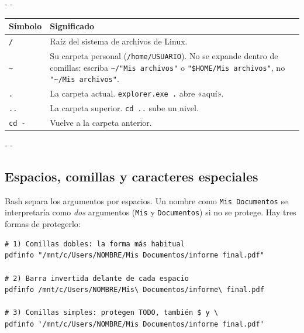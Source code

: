\documentclass[11pt,a4paper]{article}
\makeatletter
\newcommand{\necesitaespacio}[1]{\par\penalty-100\begingroup
	\setlength{\dimen@}{#1}\dimen@ii\pagegoal\advance\dimen@ii-\pagetotal
	\ifdim\dimen@>\dimen@ii\ifdim\dimen@ii>\z@\vfil\fi\penalty-\@M\fi\endgroup}
\newcommand{\cmd}[1]{\texttt{\textcolor{colcmd}{#1}}}      %
\newcommand{\arch}[1]{\texttt{\textcolor{colarch}{#1}}}    %
\newcommand{\cab}[1]{\textbf{#1}}
\newcommand{\tl}{\textasciitilde{}}  %
\makeatother
\begin{document}
	\begingroup\small
	\necesitaespacio{13\baselineskip}
	\begin{longtable}{L{2.4cm}L{12.66cm}}
		\toprule{}\cab{Símbolo} & \cab{Significado}\\\midrule
		\endfirsthead
		\bottomrule
		\endfoot
		\arch{/} & Raíz del sistema de archivos de Linux.\\*
		\arch{\tl} & Su carpeta personal (\arch{/home/USUARIO}). No se expande dentro de comillas: escriba \arch{\tl/\allowbreak{}"Mis archivos"} o \arch{"\$HOME/\allowbreak{}Mis archivos"}, no \arch{"\tl/\allowbreak{}Mis archivos"}.\\
		\arch{.} & La carpeta actual. \cmd{explorer.exe .} abre «aquí».\\
		\arch{..} & La carpeta superior. \cmd{cd ..} sube un nivel.\\*
		\cmd{cd -} & Vuelve a la carpeta anterior.\\
	\end{longtable}
	\endgroup
	
	\necesitaespacio{8\baselineskip}
	\subsection{Espacios, comillas y caracteres especiales}\label{sec:comillas}
	
	Bash separa los argumentos por espacios. Un nombre como \arch{Mis Documentos} se interpretaría como \emph{dos} argumentos (\arch{Mis} y \arch{Documentos}) si no se protege. Hay tres formas de protegerlo:
	
	\begin{lstlisting}
# 1) Comillas dobles: la forma más habitual
pdfinfo "/mnt/c/Users/NOMBRE/Mis Documentos/informe final.pdf"

# 2) Barra invertida delante de cada espacio
pdfinfo /mnt/c/Users/NOMBRE/Mis\ Documentos/informe\ final.pdf

# 3) Comillas simples: protegen TODO, también $ y \
pdfinfo '/mnt/c/Users/NOMBRE/Mis Documentos/informe final.pdf'
\end{lstlisting}
	
\end{document}
